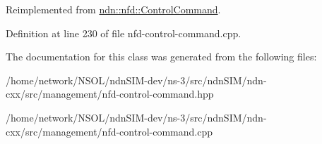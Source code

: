 Reimplemented from \hyperlink{classndn_1_1nfd_1_1ControlCommand_a479414f06f65e7ad819c94e365fa0981}{ndn\+::nfd\+::\+Control\+Command}.



Definition at line 230 of file nfd-\/control-\/command.\+cpp.



The documentation for this class was generated from the following files\+:\begin{DoxyCompactItemize}
\item 
/home/network/\+N\+S\+O\+L/ndn\+S\+I\+M-\/dev/ns-\/3/src/ndn\+S\+I\+M/ndn-\/cxx/src/management/nfd-\/control-\/command.\+hpp\item 
/home/network/\+N\+S\+O\+L/ndn\+S\+I\+M-\/dev/ns-\/3/src/ndn\+S\+I\+M/ndn-\/cxx/src/management/nfd-\/control-\/command.\+cpp\end{DoxyCompactItemize}
